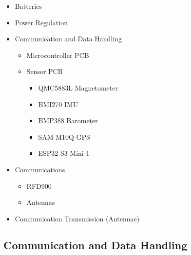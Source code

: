 \documentclass{report}
\begin{document}
            \begin{itemize}
                \item Batteries
                \item Power Regulation
                \item Communication and Data Handling
                \begin{itemize}
                    \item Microcontroller PCB
                    \item Sensor PCB
                    \begin{itemize}
                        \item QMC5883L Magnetometer
                        \item BMI270 IMU
                        \item BMP388 Barometer
                        \item SAM-M10Q GPS
                        \item ESP32-S3-Mini-1
                    \end{itemize}
                \end{itemize}
                \item Communications
                \begin{itemize}
                    \item RFD900
                    \item Antennas
                \end{itemize}
                \item Communication Transmission (Antennae)
            \end{itemize}
            \subsection{Communication and Data Handling}
\end{document}
